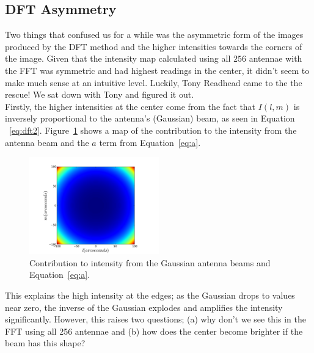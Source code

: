 \documentclass[11pt,letterpaper]{article}
\begin{document}
\subsection{DFT Asymmetry}

Two things that confused us for a while was the asymmetric form of the images
produced by the DFT method and the higher intensities towards the corners of the image. Given that the intensity map calculated using all $256$ antennae with the FFT was symmetric and had highest readings in the center, it didn't seem to make much sense at an intuitive level. Luckily, Tony Readhead came to the the rescue! We sat down with Tony and figured it out.\\

Firstly, the higher intensities at the center come from the fact that $I(l,m)$ is inversely proportional to the antenna's (Gaussian) beam, as seen in Equation ~\ref{eq:dft2}. Figure~\ref{fig:beam} shows a map of the contribution to the intensity from the antenna beam and the $a$ term from Equation~\ref{eq:a}.

\begin{figure}[!h]
\centering
\includegraphics[width=0.5\textwidth]{DFT_image_beam.pdf}
\caption{ Contribution to intensity from the Gaussian antenna beams and Equation~\ref{eq:a}. }
\label{fig:beam}
\end{figure}

This explains the high intensity at the edges; as the Gaussian drops to values near zero, the inverse of the Gaussian explodes and amplifies the intensity significantly. However, this raises two questions; (a) why don't we see this in the FFT using all 256 antennae and (b) how does the center become brighter if the beam has this shape?\\
\end{document}
